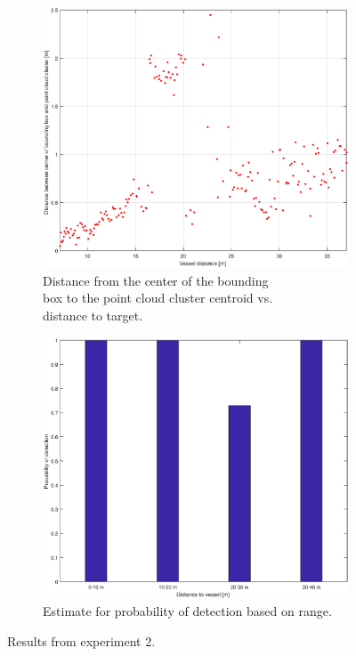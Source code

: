\begin{figure}[H]
\centering
\begin{subfigure}[t]{.5\textwidth}
	\centering
	\includegraphics[width=\linewidth]{fig/exp_2_detect_dist.eps}
	\caption{Distance from the center of the bounding\\ box to the point cloud cluster centroid vs.\\ distance to target.}
	\label{fig:sub_ex2_detect_dist}
\end{subfigure}%
\begin{subfigure}[t]{.5\textwidth}
	\centering
	\includegraphics[width=\linewidth]{fig/exp_2_probs.eps}
	\caption{Estimate for probability of detection based on range.}
	\label{fig:sub_ex2_prob}
\end{subfigure}
\caption{Results from experiment 2.}
\label{fig:ex2_plot}
\end{figure}
